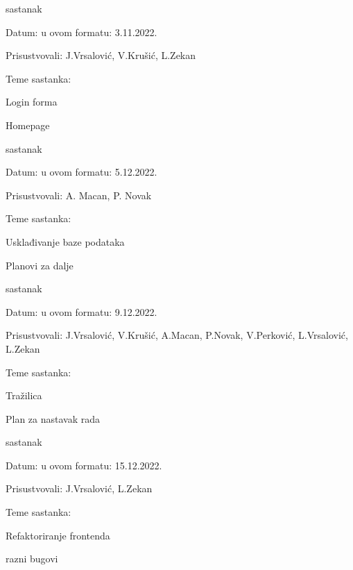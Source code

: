 \begin{packed_enum}
			\item  sastanak
			\item[] \begin{packed_item}
				\item Datum: u ovom formatu: 3.11.2022.
				\item Prisustvovali: J.Vrsalović, V.Krušić, L.Zekan
				\item Teme sastanka:
				\begin{packed_item}
					\item  Login forma
					\item  Homepage
				\end{packed_item}
			\end{packed_item}
			
			\item  sastanak
			\item[] \begin{packed_item}
				\item Datum: u ovom formatu: 5.12.2022.
				\item Prisustvovali: A. Macan, P. Novak
				\item Teme sastanka:
				\begin{packed_item}
					\item  Usklađivanje baze podataka
					\item  Planovi za dalje
				\end{packed_item}
			\end{packed_item}
			
			\item  sastanak
			\item[] \begin{packed_item}
				\item Datum: u ovom formatu: 9.12.2022.
				\item Prisustvovali: J.Vrsalović, V.Krušić, A.Macan, P.Novak, V.Perković, L.Vrsalović, L.Zekan
				\item Teme sastanka:
				\begin{packed_item}
					\item  Tražilica
					\item  Plan za nastavak rada
				\end{packed_item}
			\end{packed_item}
			
			\item  sastanak
			\item[] \begin{packed_item}
				\item Datum: u ovom formatu: 15.12.2022.
				\item Prisustvovali: J.Vrsalović, L.Zekan
				\item Teme sastanka:
				\begin{packed_item}
					\item  Refaktoriranje frontenda
					\item  razni bugovi
				\end{packed_item}
			\end{packed_item}
			

\end{packed_enum}
